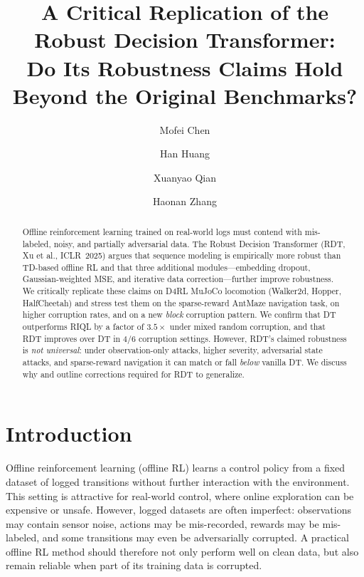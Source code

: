 \documentclass[10pt,twocolumn,letterpaper]{article}
\title{\vspace{-2em}\textbf{A Critical Replication of the Robust Decision Transformer:\\
Do Its Robustness Claims Hold Beyond the Original Benchmarks?}\vspace{-0.5em}}
\author[1]{Mofei Chen}
\author[1]{Han Huang}
\author[1]{Xuanyao Qian}
\author[1]{Haonan Zhang}
\affil[1]{Data Science Institute, Brown University \quad
\texttt{CSCI 1470 Deep Learning}\\
Code: \url{https://github.com/Pafuuuu/RobustDecisionTransformer.git}}
\date{}
\begin{document}
\maketitle
\vspace{-2em}

\begin{abstract}
\noindent
Offline reinforcement learning trained on real-world logs must contend with
mis-labeled, noisy, and partially adversarial data. The Robust Decision
Transformer (RDT, Xu et al., ICLR~2025) argues that sequence modeling is
empirically more robust than TD-based offline RL and that three additional
modules---embedding dropout, Gaussian-weighted MSE, and iterative data
correction---further improve robustness. We critically replicate these
claims on D4RL MuJoCo locomotion (Walker2d, Hopper, HalfCheetah) and stress
test them on the sparse-reward AntMaze navigation task, on higher corruption
rates, and on a new \emph{block} corruption pattern. We confirm that
DT outperforms RIQL by a factor of $3.5\times$ under mixed random
corruption, and that RDT improves over DT in $4/6$ corruption settings.
However, RDT's claimed robustness is \emph{not universal}: under
observation-only attacks, higher severity, adversarial state attacks, and
sparse-reward navigation it can match or fall \emph{below} vanilla DT.
We discuss why and outline corrections required for RDT to generalize.
\end{abstract}

\section{Introduction}
\label{sec:intro}

Offline reinforcement learning (offline RL) learns a control policy from a
fixed dataset of logged transitions without further interaction with the
environment. This setting is attractive for real-world control, where online
exploration can be expensive or unsafe. However, logged datasets are often
imperfect: observations may contain sensor noise, actions may be
mis-recorded, rewards may be mis-labeled, and some transitions may even be
adversarially corrupted. A practical offline RL method should therefore not
only perform well on clean data, but also remain reliable when part of its
training data is corrupted.
\end{document}
